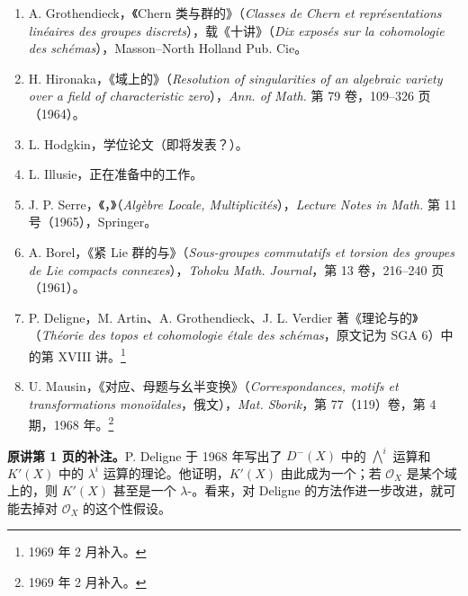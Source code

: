 \begin{enumerate}
\item[{[10]}] A. Grothendieck，《Chern 类与群的》（\textit{Classes de Chern et représentations linéaires des groupes discrets}），载《十讲》（\textit{Dix exposés sur la cohomologie des schémas}），Masson--North Holland Pub. Cie。
\item[{[11]}] H. Hironaka，《域上的》（\textit{Resolution of singularities of an algebraic variety over a field of characteristic zero}），\textit{Ann. of Math.} 第 79 卷，109--326 页（1964）。
\item[{[12]}] L. Hodgkin，学位论文（即将发表？）。
\item[{[13]}] L. Illusie，正在准备中的工作。
\item[{[14]}] J. P. Serre，《，》（\textit{Algèbre Locale, Multiplicités}），\textit{Lecture Notes in Math.} 第 11 号（1965），Springer。
\item[{[15]}] A. Borel，《紧 Lie 群的与》（\textit{Sous-groupes commutatifs et torsion des groupes de Lie compacts connexes}），\textit{Tohoku Math. Journal}，第 13 卷，216--240 页（1961）。
\item[{[16]}] P. Deligne，M. Artin、A. Grothendieck、J. L. Verdier 著《理论与的》（\textit{Théorie des topos et cohomologie étale des schémas}，原文记为 SGA 6）中的第 XVIII 讲。\footnote{1969 年 2 月补入。}
\item[{[17]}] U. Mausin，《对应、母题与幺半变换》（\textit{Correspondances, motifs et transformations monoïdales}，俄文），\textit{Mat. Sborik}，第 77（119）卷，第 4 期，1968 年。\footnote{1969 年 2 月补入。}
\end{enumerate}

\textbf{原讲第 1 页的补注。}P. Deligne 于 1968 年写出了 $D^-(X)$ 中的 $\bigwedge^i$ 运算和 $K'(X)$ 中的 $\lambda^i$ 运算的理论。他证明，$K'(X)$ 由此成为一个；若 $\mathscr O_X$ 是某个域上的，则 $K'(X)$ 甚至是一个 $\lambda$-。看来，对 Deligne 的方法作进一步改进，就可能去掉对 $\mathscr O_X$ 的这个性假设。

